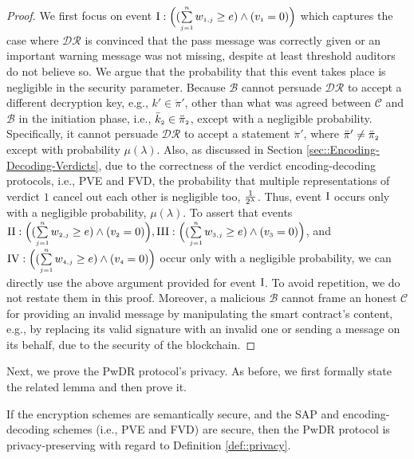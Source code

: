 \begin{proof}
%
We first focus on event $\text{\MakeUppercase{\romannumeral 1}}: \Big( (\sum\limits_{\st j=1}^{\st n}w_{\st 1,j}\geq e) \wedge ( v_{\st 1}=0)\Big)$ which captures the case where  $\mathcal{DR}$ is convinced that the pass message was correctly given or an important warning message was not missing, despite at least threshold auditors do not believe so. We argue that the probability that this event takes place is negligible in the security parameter. Because $\mathcal{B}$ cannot persuade $\mathcal{DR}$ to accept a different decryption key, e.g., $k'\in \ddot\pi'$, other than what was agreed between $\mathcal{C}$ and $\mathcal{B}$ in the initiation phase, i.e., $\bar k_{\scriptscriptstyle 2}\in \ddot\pi_{\scriptscriptstyle 2}$, except with a negligible probability. Specifically, it cannot persuade  $\mathcal{DR}$ to accept a statement $\ddot \pi'$, where $\ddot \pi'\neq \ddot \pi_{\scriptscriptstyle 2}$ except with   probability $\mu(\lambda)$. Also, as discussed in Section \ref{sec::Encoding-Decoding-Verdicts}, due to the correctness of the verdict encoding-decoding protocols, i.e., PVE and FVD, the probability that multiple representations of verdict  $1$ cancel out each other is negligible too, $\frac{1}{2^{\scriptscriptstyle \lambda}}$. Thus,  event $\text{\MakeUppercase{\romannumeral 1}}$ occurs only with a negligible probability, $\mu(\lambda)$. To  assert that   events $\text{\MakeUppercase{\romannumeral 2}}: \Big(( \sum\limits_{\st j=1}^{\st n}w_{\st 2,j}\geq e) \wedge ( v_{\st 2}=0)\Big), \text{\MakeUppercase{\romannumeral 3}}: \Big(( \sum\limits_{\st j=1}^{\st n}w_{\st 3,j}\geq e) \wedge ( v_{\st 3}=0)\Big)$, and $\text{\MakeUppercase{\romannumeral 4}}: \Big(( \sum\limits_{\st j=1}^{\st n}w_{\st 4,j}\geq e) \wedge ( v_{\st 4}=0)\Big)$ occur only with a  negligible probability, we can directly use the above argument provided for event $\text{\MakeUppercase{\romannumeral 1}}$. To avoid repetition, we do not restate them in this proof.  Moreover, a malicious $\mathcal{B}$ cannot frame an honest $\mathcal{C}$ for providing an invalid message by manipulating the smart contract’s content,  e.g., by replacing its valid signature with an invalid one or sending a message on its behalf, due to the security of the blockchain.
\end{proof}


Next, we prove the PwDR protocol's privacy. As before, we first formally state the related lemma and then prove it. 


\begin{lemma}\label{lemma::privacy}
If the encryption schemes are semantically secure, and the SAP and encoding-decoding schemes (i.e., PVE and FVD)  are secure, then the PwDR protocol is privacy-preserving with regard to Definition \ref{def::privacy}.  
\end{lemma}

